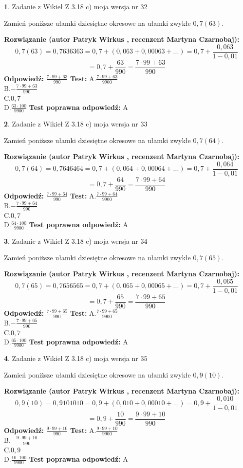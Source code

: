 \documentclass[12pt, a4paper]{article}
\theoremstyle{definition} %
\newtheorem{zad}{}
\newcommand{\zadStart}[1]{\begin{zad}#1\newline}
\newcommand{\zadStop}{\end{zad}}
\newcommand{\rozwStart}[2]{\noindent \textbf{Rozwiązanie (autor #1 , recenzent #2): }\newline}
\newcommand{\rozwStop}{\newline}
\newcommand{\odpStart}{\noindent \textbf{Odpowiedź:}\newline}
\newcommand{\odpStop}{\newline}
\newcommand{\testStart}{\noindent \textbf{Test:}\newline}
\newcommand{\testStop}{\newline}
\newcommand{\kluczStart}{\noindent \textbf{Test poprawna odpowiedź:}\newline}
\newcommand{\kluczStop}{\newline}
\begin{document}
\zadStart{Zadanie z Wikieł Z 3.18 c) moja wersja nr 32}

Zamień poniższe ułamki dziesiętne okresowe na ułamki zwykłe $0,7(63)$.
\zadStop
\rozwStart{Patryk Wirkus}{Martyna Czarnobaj}
$$0,7(63)=0,7636363=0,7+(0,063+0,00063+...)=0,7+\frac{0,063}{1-0,01}$$
$$=0,7+\frac{63}{990}=\frac{7\cdot99+63}{990}$$
\rozwStop
\odpStart
$\frac{7\cdot99+63}{990}$
\odpStop
\testStart
A.$\frac{7\cdot99+63}{9900}$\\ B.$-\frac{7\cdot99+63}{990}$\\ C.$0,7$\\ D.$\frac{63\cdot100}{9900}$
\testStop
\kluczStart
A
\kluczStop



\zadStart{Zadanie z Wikieł Z 3.18 c) moja wersja nr 33}

Zamień poniższe ułamki dziesiętne okresowe na ułamki zwykłe $0,7(64)$.
\zadStop
\rozwStart{Patryk Wirkus}{Martyna Czarnobaj}
$$0,7(64)=0,7646464=0,7+(0,064+0,00064+...)=0,7+\frac{0,064}{1-0,01}$$
$$=0,7+\frac{64}{990}=\frac{7\cdot99+64}{990}$$
\rozwStop
\odpStart
$\frac{7\cdot99+64}{990}$
\odpStop
\testStart
A.$\frac{7\cdot99+64}{9900}$\\ B.$-\frac{7\cdot99+64}{990}$\\ C.$0,7$\\ D.$\frac{64\cdot100}{9900}$
\testStop
\kluczStart
A
\kluczStop



\zadStart{Zadanie z Wikieł Z 3.18 c) moja wersja nr 34}

Zamień poniższe ułamki dziesiętne okresowe na ułamki zwykłe $0,7(65)$.
\zadStop
\rozwStart{Patryk Wirkus}{Martyna Czarnobaj}
$$0,7(65)=0,7656565=0,7+(0,065+0,00065+...)=0,7+\frac{0,065}{1-0,01}$$
$$=0,7+\frac{65}{990}=\frac{7\cdot99+65}{990}$$
\rozwStop
\odpStart
$\frac{7\cdot99+65}{990}$
\odpStop
\testStart
A.$\frac{7\cdot99+65}{9900}$\\ B.$-\frac{7\cdot99+65}{990}$\\ C.$0,7$\\ D.$\frac{65\cdot100}{9900}$
\testStop
\kluczStart
A
\kluczStop



\zadStart{Zadanie z Wikieł Z 3.18 c) moja wersja nr 35}

Zamień poniższe ułamki dziesiętne okresowe na ułamki zwykłe $0,9(10)$.
\zadStop
\rozwStart{Patryk Wirkus}{Martyna Czarnobaj}
$$0,9(10)=0,9101010=0,9+(0,010+0,00010+...)=0,9+\frac{0,010}{1-0,01}$$
$$=0,9+\frac{10}{990}=\frac{9\cdot99+10}{990}$$
\rozwStop
\odpStart
$\frac{9\cdot99+10}{990}$
\odpStop
\testStart
A.$\frac{9\cdot99+10}{9900}$\\ B.$-\frac{9\cdot99+10}{990}$\\ C.$0,9$\\ D.$\frac{10\cdot100}{9900}$
\testStop
\kluczStart
A
\kluczStop
\end{document}
